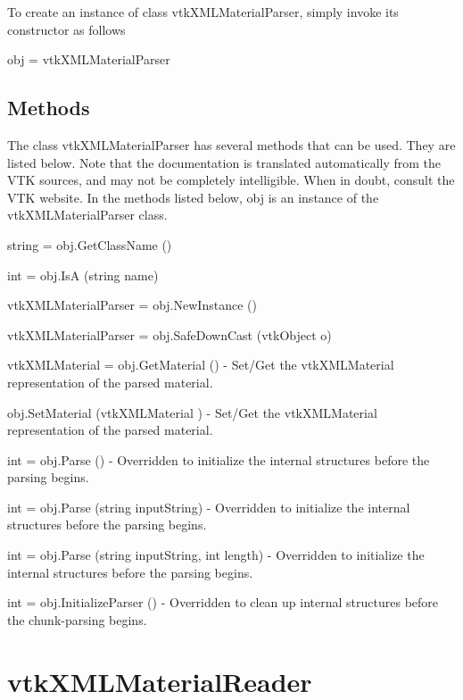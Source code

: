 To create an instance of class vtk\-X\-M\-L\-Material\-Parser, simply invoke its constructor as follows \begin{DoxyVerb}  obj = vtkXMLMaterialParser
\end{DoxyVerb}
 \hypertarget{vtkwidgets_vtkxyplotwidget_Methods}{}\subsection{Methods}\label{vtkwidgets_vtkxyplotwidget_Methods}
The class vtk\-X\-M\-L\-Material\-Parser has several methods that can be used. They are listed below. Note that the documentation is translated automatically from the V\-T\-K sources, and may not be completely intelligible. When in doubt, consult the V\-T\-K website. In the methods listed below, {\ttfamily obj} is an instance of the vtk\-X\-M\-L\-Material\-Parser class. 
\begin{DoxyItemize}
\item {\ttfamily string = obj.\-Get\-Class\-Name ()}  
\item {\ttfamily int = obj.\-Is\-A (string name)}  
\item {\ttfamily vtk\-X\-M\-L\-Material\-Parser = obj.\-New\-Instance ()}  
\item {\ttfamily vtk\-X\-M\-L\-Material\-Parser = obj.\-Safe\-Down\-Cast (vtk\-Object o)}  
\item {\ttfamily vtk\-X\-M\-L\-Material = obj.\-Get\-Material ()} -\/ Set/\-Get the vtk\-X\-M\-L\-Material representation of the parsed material.  
\item {\ttfamily obj.\-Set\-Material (vtk\-X\-M\-L\-Material )} -\/ Set/\-Get the vtk\-X\-M\-L\-Material representation of the parsed material.  
\item {\ttfamily int = obj.\-Parse ()} -\/ Overridden to initialize the internal structures before the parsing begins.  
\item {\ttfamily int = obj.\-Parse (string input\-String)} -\/ Overridden to initialize the internal structures before the parsing begins.  
\item {\ttfamily int = obj.\-Parse (string input\-String, int length)} -\/ Overridden to initialize the internal structures before the parsing begins.  
\item {\ttfamily int = obj.\-Initialize\-Parser ()} -\/ Overridden to clean up internal structures before the chunk-\/parsing begins.  
\end{DoxyItemize}\hypertarget{vtkio_vtkxmlmaterialreader}{}\section{vtk\-X\-M\-L\-Material\-Reader}\label{vtkio_vtkxmlmaterialreader}
